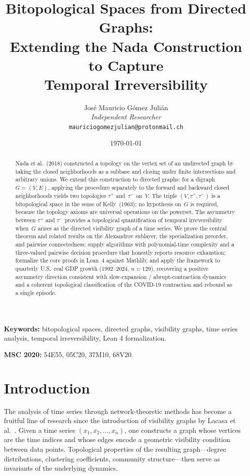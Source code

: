 \documentclass[11pt,a4paper]{article}
\title{%
  Bitopological Spaces from Directed Graphs:\\
  Extending the Nada Construction to Capture\\
  Temporal Irreversibility%
}
\author{%
  Jos\'e Mauricio G\'omez Juli\'an\\
  \textit{Independent Researcher}\\
  \texttt{mauriciogomezjulian@protonmail.ch}%
}
\date{\today}
\theoremstyle{plain}
\theoremstyle{definition}
\newcommand{\taufwd}{\tau^{+}}
\newcommand{\taubwd}{\tau^{-}}
\begin{document}
\maketitle

\begin{abstract}
Nada et al.\ (2018) constructed a topology on the vertex set of an
undirected graph by taking the closed neighborhoods as a subbase and
closing under finite intersections and arbitrary unions.  We extend this
construction to directed graphs: for a digraph $G = (V, E)$, applying the
procedure separately to the forward and backward closed neighborhoods
yields two topologies $\taufwd$ and~$\taubwd$ on~$V$.  The triple
$(V, \taufwd, \taubwd)$ is a bitopological space in the sense of
Kelly~(1963); no hypothesis on~$G$ is required, because the topology
axioms are universal operations on the powerset.  The asymmetry between
$\taufwd$ and $\taubwd$ provides a topological quantification of temporal
irreversibility when~$G$ arises as the directed visibility graph of a
time series.  We prove the central theorem and related results on the
Alexandrov sublayer, the specialization preorder, and pairwise
connectedness; supply algorithms with polynomial-time complexity and a
three-valued pairwise decision procedure that honestly reports resource
exhaustion; formalize the core proofs in Lean~4 against Mathlib; and
apply the framework to quarterly U.S.\ real GDP growth (1992--2024,
$n = 129$), recovering a positive asymmetry direction consistent with
slow-expansion / abrupt-contraction dynamics and a coherent topological
classification of the COVID-19 contraction and rebound as a single
episode.
\end{abstract}

\medskip
\noindent\textbf{Keywords:} bitopological spaces, directed graphs, visibility
graphs, time series analysis, temporal irreversibility, Lean 4 formalization.

\medskip
\noindent\textbf{MSC 2020:} 54E55, 05C20, 37M10, 68V20.

\section{Introduction}\label{sec:intro}

The analysis of time series through network-theoretic methods has become a
fruitful line of research since the introduction of visibility graphs by Lacasa
et al.~\cite{Lacasa2008}.  Given a time series $(x_1, x_2, \ldots, x_n)$, one
constructs a graph whose vertices are the time indices and whose edges encode a
geometric visibility condition between data points.  Topological properties of
the resulting graph---degree distributions, clustering coefficients, community
structure---then serve as invariants of the underlying dynamics.
\end{document}
